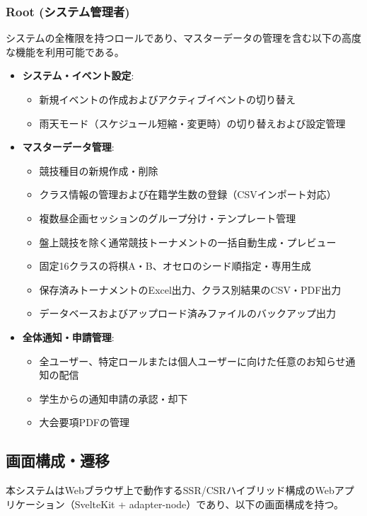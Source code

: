 \documentclass[paper=a4, fontsize=11pt]{jlreq}
\begin{document}
\subsubsection{Root (システム管理者)}
システムの全権限を持つロールであり、マスターデータの管理を含む以下の高度な機能を利用可能である。
\begin{itemize}
    \item \textbf{システム・イベント設定}:
    \begin{itemize}
        \item 新規イベントの作成およびアクティブイベントの切り替え
        \item 雨天モード（スケジュール短縮・変更時）の切り替えおよび設定管理
    \end{itemize}
    \item \textbf{マスターデータ管理}:
    \begin{itemize}
        \item 競技種目の新規作成・削除
        \item クラス情報の管理および在籍学生数の登録（CSVインポート対応）
        \item 複数昼企画セッションのグループ分け・テンプレート管理
        \item 盤上競技を除く通常競技トーナメントの一括自動生成・プレビュー
        \item 固定16クラスの将棋A・B、オセロのシード順指定・専用生成
        \item 保存済みトーナメントのExcel出力、クラス別結果のCSV・PDF出力
        \item データベースおよびアップロード済みファイルのバックアップ出力
    \end{itemize}
    \item \textbf{全体通知・申請管理}:
    \begin{itemize}
        \item 全ユーザー、特定ロールまたは個人ユーザーに向けた任意のお知らせ通知の配信
        \item 学生からの通知申請の承認・却下
        \item 大会要項PDFの管理
    \end{itemize}
\end{itemize}

\subsection{画面構成・遷移}
本システムはWebブラウザ上で動作するSSR/CSRハイブリッド構成のWebアプリケーション（SvelteKit + adapter-node）であり、以下の画面構成を持つ。
\end{document}
